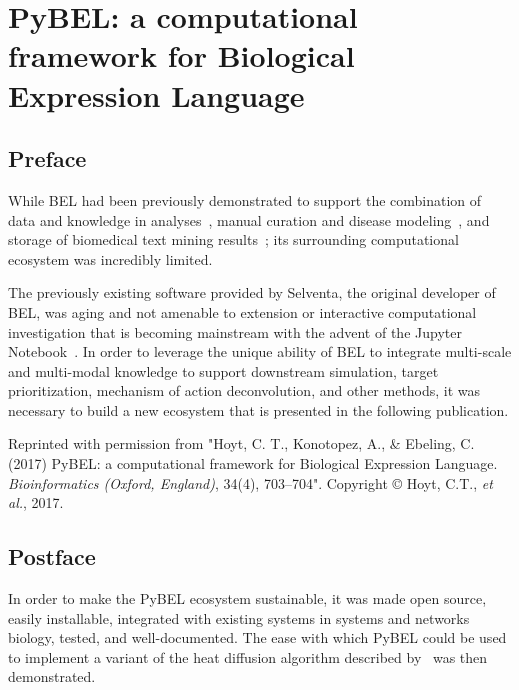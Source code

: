 \chapter{PyBEL: a computational framework for Biological Expression Language}
\label{ch:pybel}

\section*{Preface}

While \ac{BEL} had been previously demonstrated to support the combination of data and knowledge in analyses~\cite{Martin2012,Laifenfeld2012,Catlett2013,Martin2014,Vasilyev2014,Laifenfeld2014}, manual curation and disease modeling~\cite{Kodamullil2015,Irin2015,Naz2016,Karki2017,Emon2017,Domingo-Fernandez2017}, and storage of biomedical text mining results~\cite{Lai2016,Madan2016,Rastegar-Mojarad2016,Ravikumar2017,Ali2017}; its surrounding computational ecosystem was incredibly limited.

The previously existing software provided by Selventa, the original developer of BEL, was aging and not amenable to extension or interactive computational investigation that is becoming mainstream with the advent of the Jupyter Notebook~\cite{Kluyver2016}.
In order to leverage the unique ability of \ac{BEL} to integrate multi-scale and multi-modal knowledge to support downstream simulation, target prioritization, mechanism of action deconvolution, and other methods, it was necessary to build a new ecosystem that is presented in the following publication.

\vspace*{\fill}

Reprinted with permission from "Hoyt, C. T., Konotopez, A., \& Ebeling, C. (2017) PyBEL: a computational framework for Biological Expression Language. \textit{Bioinformatics (Oxford, England)}, 34(4), 703–704".
Copyright © Hoyt, C.T., \textit{et al.}, 2017.



\section*{Postface}

In order to make the PyBEL ecosystem sustainable, it was made open source, easily installable, integrated with existing systems in systems and networks biology, tested, and well-documented.
The ease with which PyBEL could be used to implement a variant of the heat diffusion algorithm described by~\cite{Leiserson2015} was then demonstrated.

